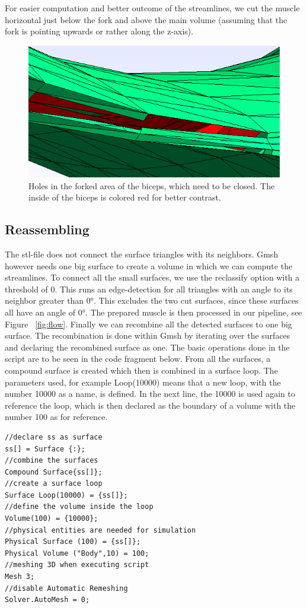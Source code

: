 \documentclass[preprint,journal]{vgtc}       %
\begin{document}
For easier computation and better outcome of the streamlines, we cut the muscle horizontal just below the fork and above the main volume (assuming that the fork is pointing upwards or rather along the z-axis). 

\begin{figure} [H]
	\begin{center}
		\includegraphics[width = .6\linewidth]{holes.png}
	\end{center}
	\caption{Holes in the forked area of the biceps, which need to be closed. The inside of the biceps is colored red for better contrast.}
	\label{fig:holes}
\end{figure}

\subsection{Reassembling}
The stl-file does not connect the surface triangles with its neighbors. 
Gmsh however needs one big surface to create a volume in which we can compute the streamlines. 
To connect all the small surfaces, we use the reclassify option with a threshold of 0.
This runs an edge-detection for all triangles with an angle to its neighbor greater than \ang{0}. 
This excludes the two cut surfaces, since these surfaces all have an angle of \ang{0}. 
The prepared muscle is then processed in our pipeline, see Figure ~\ref{fig:flow}. 
Finally we can recombine all the detected surfaces to one big surface. 
The recombination is done within Gmsh by iterating over the surfaces and declaring the recombined surface as one. 
The basic operations done in the script are to be seen in the code fragment below. 
From all the surfaces, a compound surface is created which then is combined in a surface loop. 
The parameters used, for example Loop(10000) means that a new loop, with the number 10000 as a name, is defined. 
In the next line, the 10000 is used again to reference the loop, which is then declared as the boundary of a volume with the number 100 as for reference. 

\begin{verbatim}
//declare ss as surface
ss[] = Surface {:};
//combine the surfaces
Compound Surface{ss[]};
//create a surface loop
Surface Loop(10000) = {ss[]};
//define the volume inside the loop
Volume(100) = {10000};
//physical entities are needed for simulation
Physical Surface (100) = {ss[]};
Physical Volume ("Body",10) = 100;
//meshing 3D when executing script
Mesh 3;
//disable Automatic Remeshing
Solver.AutoMesh = 0;
\end{verbatim}
\end{document}
